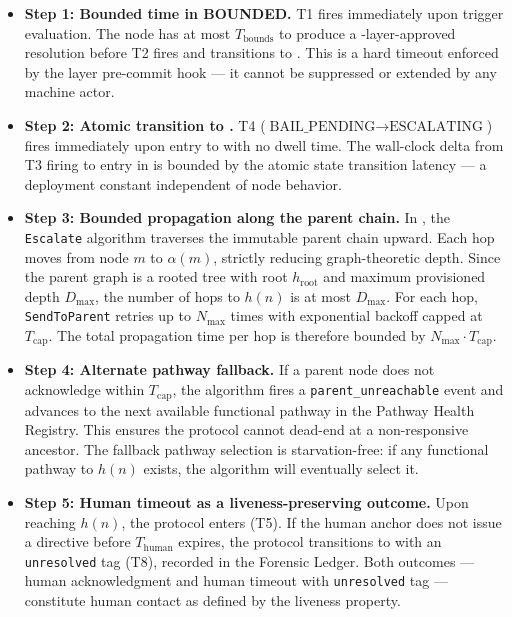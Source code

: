 \begin{itemize}
  \setlength\itemsep{0pt}
  \item[$\bullet$] \textbf{Step 1: Bounded time in BOUNDED.}
    T1 fires immediately upon trigger evaluation. The node has at most
    $T_{\text{bounds}}$ to produce a \fact-layer-approved resolution before T2 fires
    and transitions to . This is a hard timeout enforced by the
    \fact{} layer pre-commit hook — it cannot be suppressed or extended by any machine
    actor.

  \item[$\bullet$] \textbf{Step 2: Atomic transition to .}
    T4 ($\text{BAIL\_PENDING} \rightarrow \text{ESCALATING}$) fires immediately upon
    entry to  with no dwell time. The wall-clock delta from T3
    firing to entry in  is bounded by the atomic state transition
    latency — a deployment constant independent of node behavior.

  \item[$\bullet$] \textbf{Step 3: Bounded propagation along the parent chain.}
    In , the \texttt{Escalate} algorithm traverses the immutable parent
    chain upward. Each hop moves from node $m$ to $\alpha(m)$, strictly reducing
    graph-theoretic depth. Since the parent graph is a rooted tree with root
    $h_{\text{root}}$ and maximum provisioned depth $D_{\max}$, the number of hops to
    $h(n)$ is at most $D_{\max}$. For each hop, \texttt{SendToParent} retries up to
    $N_{\max}$ times with exponential backoff capped at $T_{\text{cap}}$. The total
    propagation time per hop is therefore bounded by $N_{\max} \cdot T_{\text{cap}}$.

  \item[$\bullet$] \textbf{Step 4: Alternate pathway fallback.}
    If a parent node does not acknowledge within $T_{\text{cap}}$, the algorithm fires a
    \texttt{parent\_unreachable} event and advances to the next available functional
    pathway in the Pathway Health Registry. This ensures the protocol cannot dead-end
    at a non-responsive ancestor. The fallback pathway selection is starvation-free: if
    any functional pathway to $h(n)$ exists, the algorithm will eventually select it.

  \item[$\bullet$] \textbf{Step 5: Human timeout as a liveness-preserving outcome.}
    Upon reaching $h(n)$, the protocol enters  (T5). If the
    human anchor does not issue a directive before $T_{\text{human}}$ expires, the
    protocol transitions to  with an \texttt{unresolved} tag (T8),
    recorded in the Forensic Ledger. Both outcomes — human acknowledgment and human
    timeout with \texttt{unresolved} tag — constitute human contact as defined by
    the liveness property.


\end{itemize}
